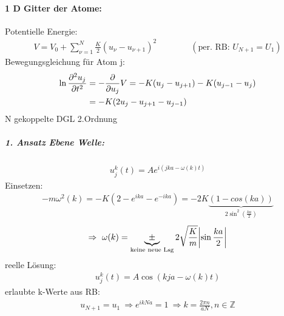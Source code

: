 \paragraph{1 D Gitter der Atome:}
\begin{center}
\end{center}
Potentielle Energie:
\begin{align}
    V=V_0+\sum_{\nu =1}^N \frac{K}{2} (u_\nu-u_{\nu+1})^2 \qquad \qquad (\text{per. RB: }U_{N+1}=U_1)
\end{align}
Bewegungsgleichung für Atom j:
\begin{align}
    \ln \pdv[2]{u_j}{t} &= - \pdv{u_j} V = -K(u_j - u_{j+1})-K(u_{j-1}-u_j)\\
    &= -K(2u_j-u_{j+1}-u_{j-1})
\end{align}
N gekoppelte DGL 2.Ordnung
\subparagraph{1. Ansatz Ebene Welle:}
\begin{align}
    u_j^k(t)=Ae^{i(jka-\omega (k) t)}
\end{align}
Einsetzen:
\begin{align}
    -m\omega^2(k)=-K(2-e^{ika}-e^{-ika})=-2K\underbrace{(1-cos(ka))}_{2\sin^2(\frac{ka}{2})}
\end{align}
\begin{align}
    \Rightarrow \ \omega (k) = \underbrace{\pm}_{\text{keine neue Lsg}} 2\sqrt{\frac{K}{m}}\abs{\sin{\frac{ka}{2}}}
\end{align}
reelle Lösung:
\begin{align}
    u_j^k(t)=A\cos{(kja-\omega (k)t)}
\end{align}
erlaubte k-Werte aus RB:
\begin{align}
    u_{N+1}=u_1 \ \Rightarrow e^{ikNa}=1 \ \Rightarrow k=\frac{2\pi n}{aN}, n \in \mathbb{Z}
\end{align}
